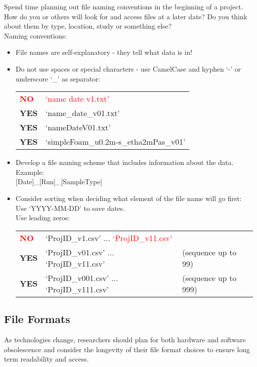 Spend time planning out file naming conventions in the beginning of a project.
How do you or others will look for and access files at a later date? Do you
think about them by type, location, study or something else? \\[8pt]
Naming conventions:
\begin{itemize}
  \item File names are self-explanatory - they tell what data is in!
  \item Do not use spaces or special characters - use CamelCase and hyphen
        ‘-’ or underscore ‘\_’ as separator: \\
        \begin{tabular}{ll}
          \textcolor{red}{\textbf{NO}}  & \textcolor{red}{‘name date v1.txt’} \\
          \textbf{YES} & ‘name\_date\_v01.txt’ \\
          \textbf{YES} & ‘nameDateV01.txt’ \\
          \textbf{YES} & ‘simpleFoam\_u0.2m-s\_etha2mPas\_v01’ \\
        \end{tabular}
  \item Develop a file naming scheme that includes information about the data.
        Example: \\
        {[Date]}\_{[Run]}\_{[SampleType]}
  \item Consider sorting when deciding what element of the file name will
        go first: \\
        Use ‘YYYY-MM-DD’ to save dates. \\
        Use leading zeros: \\
        \begin{tabular}{lll}
          \textcolor{red}{\textbf{NO}}  & ‘ProjID\_v1.csv’  	...  	\textcolor{red}{‘ProjID\_v11.csv’} & \\
          \textbf{YES} & ‘ProjID\_v01.csv’ 	... 	‘ProjID\_v11.csv’
             & (sequence up to 99) \\
          \textbf{YES} & ‘ProjID\_v001.csv’ 	...	‘ProjID\_v111.csv’
             & (sequence up to 999) \\
        \end{tabular}
\end{itemize}

\subsection{File Formats}
As technologies change, researchers should plan for both hardware and software
obsolescence and consider the longevity of their file format choices to ensure
long term readability and access.


